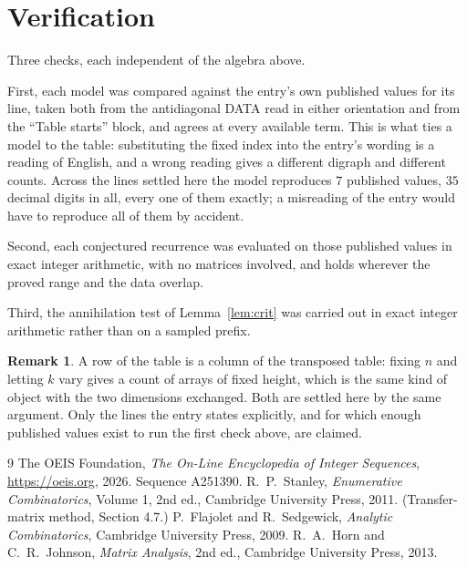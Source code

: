 \documentclass[11pt,a4paper]{article}
\theoremstyle{plain}
\theoremstyle{definition}
\newtheorem{remark}[theorem]{Remark}
\begin{document}
\section{Verification}

Three checks, each independent of the algebra above.

First, each model was compared against the entry's own published values for its line, taken
both from the antidiagonal DATA read in either orientation and from the ``Table starts''
block, and agrees at every available term. This is what ties a model to the table:
substituting the fixed index into the entry's wording is a reading of English, and a wrong
reading gives a different digraph and different counts. Across the lines settled here the
model reproduces $7$ published values, $35$ decimal digits in all, every one of
them exactly; a misreading of the entry would have to reproduce all of them by accident.

Second, each conjectured recurrence was evaluated on those published values in exact
integer arithmetic, with no matrices involved, and holds wherever the proved range and the
data overlap.

Third, the annihilation test of Lemma~\ref{lem:crit} was carried out in exact integer
arithmetic rather than on a sampled prefix.

\begin{remark}
A row of the table is a column of the transposed table: fixing $n$ and letting $k$ vary gives a
count of arrays of fixed height, which is the same kind of object with the two dimensions
exchanged. Both are settled here by the same argument. Only the lines the entry states
explicitly, and for which enough published values exist to run the first check above, are
claimed.
\end{remark}

\begin{thebibliography}{9}
 The OEIS Foundation, \emph{The On-Line Encyclopedia of Integer
Sequences}, \url{https://oeis.org}, 2026. Sequence A251390.
 R.~P.~Stanley, \emph{Enumerative Combinatorics}, Volume 1, 2nd ed.,
Cambridge University Press, 2011. (Transfer-matrix method, Section 4.7.)
 P.~Flajolet and R.~Sedgewick, \emph{Analytic Combinatorics}, Cambridge
University Press, 2009.
 R.~A.~Horn and C.~R.~Johnson, \emph{Matrix Analysis}, 2nd ed., Cambridge
University Press, 2013.
\end{thebibliography}
\end{document}

